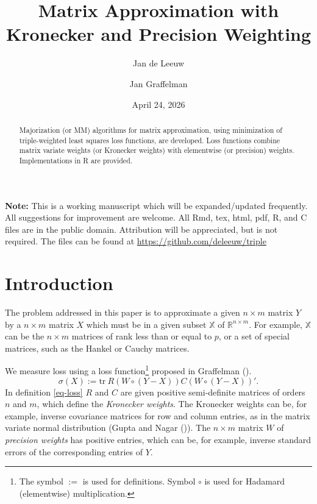 \documentclass[
  12pt,
  letterpaper,
  DIV=11,
  numbers=noendperiod]{scrartcl}
\title{Matrix Approximation with Kronecker and Precision Weighting}
\author{Jan de Leeuw \and Jan Graffelman}
\date{April 24, 2026}
\newcommand{\sectionbreak}{\clearpage}
\renewcommand*\contentsname{Table of contents}
\newcommand\contentsname{Table of contents}
\begin{document}
\maketitle
\begin{abstract}
Majorization (or MM) algorithms for matrix approximation, using
minimization of triple-weighted least squares loss functions, are
developed. Loss functions combine matrix variate weights (or Kronecker
weights) with elementwise (or precision) weights. Implementations in R
are provided.
\end{abstract}

\renewcommand*\contentsname{Table of contents}
{
\setcounter{tocdepth}{3}
\tableofcontents
}

\sectionbreak

\textbf{Note:} This is a working manuscript which will be
expanded/updated frequently. All suggestions for improvement are
welcome. All Rmd, tex, html, pdf, R, and C files are in the public
domain. Attribution will be appreciated, but is not required. The files
can be found at \url{https://github.com/deleeuw/triple}

\sectionbreak

\section{Introduction}\label{introduction}

The problem addressed in this paper is to approximate a given
\(n\times m\) matrix \(Y\) by a \(n\times m\) matrix \(X\) which must be
in a given subset \(\mathbb{X}\) of \(\mathbb{R}^{n\times m}\). For
example, \(\mathbb{X}\) can be the \(n\times m\) matrices of rank less
than or equal to \(p\), or a set of special matrices, such as the Hankel
or Cauchy matrices.

We measure loss using a loss
function\footnote{The symbol $:=$ is used for definitions. Symbol $\circ$ is used for Hadamard (elementwise) multiplication.}
proposed in Graffelman ().
\begin{equation}
\sigma(X):=\text{tr}\ R(W\circ(Y-X))C(W\circ(Y-X))'.\label{eq-loss}
\end{equation} In definition \eqref{eq-loss} \(R\) and \(C\) are given
positive semi-definite matrices of orders \(n\) and \(m\), which define
the \emph{Kronecker weights}. The Kronecker weights can be, for example,
inverse covariance matrices for row and column entries, as in the matrix
variate normal distribution (Gupta and Nagar
()). The \(n\times m\) matrix \(W\)
of \emph{precision weights} has positive entries, which can be, for
example, inverse standard errors of the corresponding entries of \(Y\).
\end{document}
